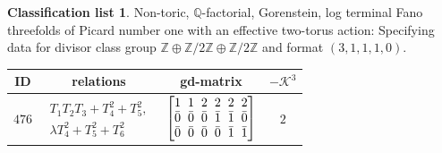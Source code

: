\documentclass[10pt,a4paper]{amsart}
\theoremstyle{definition}
\newtheorem{class-list}[thm]{Classification list}
\def\ZZ{{\mathbb Z}}
\def\QQ{{\mathbb Q}}
\numberwithin{equation}{section}
\begin{document}
\begin{class-list}
Non-toric, $\QQ$-factorial, Gorenstein, log terminal Fano
threefolds of Picard number one with an effective two-torus action:
Specifying data for divisor class group
$\ZZ\oplus \ZZ/2\ZZ\oplus \ZZ/2\ZZ$ and format $(3,1,1,1,0)$.
\begin{table}[h!]\centering\setlength{\tabcolsep}{5.5pt}
\renewcommand{\arraystretch}{1.25}\small\tabulinesep=1mm
\begin{tabu}{c|c|c|c}
\hline
ID&relations&gd-matrix&$-\mathcal{K}^3$
\\
\hline
${476}$&$\begin{array}{r}{T_{1}T_{2}T_{3}+T_{4}^{2}+T_{5}^{2}},\\ {\lambda T_{4}^{2}+T_{5}^{2}+T_{6}^{2}}\end{array}$
&$\arraycolsep=1mm\begin{bmatrix}{1} & {1} & {2} & {2} & {2} & {2} \\ {\bar{0}} & {\bar{0}} & {\bar{0}} & {\bar{1}} & {\bar{1}} & {\bar{0}} \\ {\bar{0}} & {\bar{0}} & {\bar{0}} & {\bar{0}} & {\bar{1}} & {\bar{1}}\end{bmatrix}$&${2}$
\\
\hline
\end{tabu}%
\end{table}
\end{class-list}
\end{document}
